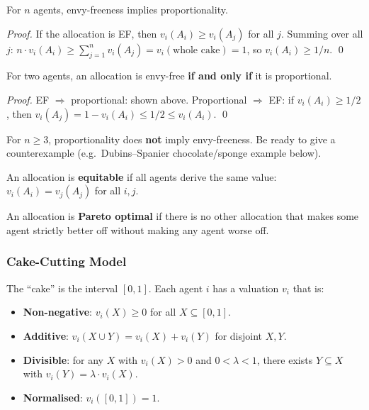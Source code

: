 \begin{thmbox}
For $n$ agents, envy-freeness implies proportionality.

\textit{Proof.} If the allocation is EF, then $v_i(A_i) \ge v_i(A_j)$ for all $j$. Summing over all $j$:
$n \cdot v_i(A_i) \ge \sum_{j=1}^{n} v_i(A_j) = v_i(\text{whole cake}) = 1$,
so $v_i(A_i) \ge 1/n$. \qed
\end{thmbox}

\begin{thmbox}[Equivalence for $n=2$]
For two agents, an allocation is envy-free \textbf{if and only if} it is proportional.

\textit{Proof.} EF $\Rightarrow$ proportional: shown above. Proportional $\Rightarrow$ EF: if $v_i(A_i) \ge 1/2$, then $v_i(A_j) = 1 - v_i(A_i) \le 1/2 \le v_i(A_i)$. \qed
\end{thmbox}

\begin{tipbox}
For $n \ge 3$, proportionality does \textbf{not} imply envy-freeness. Be ready to give a counterexample (e.g.\ Dubins--Spanier chocolate/sponge example below).
\end{tipbox}

\begin{defbox}[Equitability]
An allocation is \textbf{equitable} if all agents derive the same value: $v_i(A_i) = v_j(A_j)$ for all $i, j$.
\end{defbox}

\begin{defbox}
An allocation is \textbf{Pareto optimal} if there is no other allocation that makes some agent strictly better off without making any agent worse off.
\end{defbox}

\separator

\subsubsection{Cake-Cutting Model}

The ``cake'' is the interval $[0, 1]$. Each agent $i$ has a valuation $v_i$ that is:
\begin{itemize}
  \item \textbf{Non-negative}: $v_i(X) \ge 0$ for all $X \subseteq [0,1]$.
  \item \textbf{Additive}: $v_i(X \cup Y) = v_i(X) + v_i(Y)$ for disjoint $X, Y$.
  \item \textbf{Divisible}: for any $X$ with $v_i(X) > 0$ and $0 < \lambda < 1$, there exists $Y \subseteq X$ with $v_i(Y) = \lambda \cdot v_i(X)$.
  \item \textbf{Normalised}: $v_i([0,1]) = 1$.
\end{itemize}

